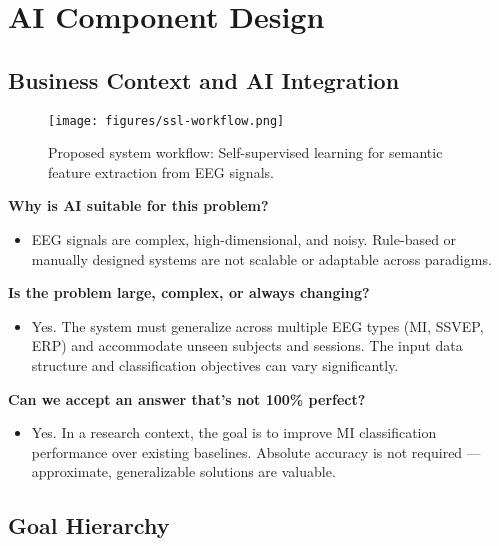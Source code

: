 \usepackage{enumitem}
\chapter{AI Component Design}
\label{ch:ai-component-design}

\section{Business Context and AI Integration}
\label{sec:business-context}

\begin{figure}[H]
    \centering
    \texttt{[image: figures/ssl-workflow.png]}
    \caption{Proposed system workflow: Self-supervised learning for semantic feature extraction from EEG signals.}
    \label{fig:ssl-workflow}
\end{figure}

\vspace{1em}
\noindent\textbf{Why is AI suitable for this problem?}
\begin{itemize}
    \item EEG signals are complex, high-dimensional, and noisy.
    Rule-based or manually designed systems are not scalable or adaptable across paradigms.
\end{itemize}

\vspace{0.5em}
\noindent\textbf{Is the problem large, complex, or always changing?}
\begin{itemize}
    \item Yes.
    The system must generalize across multiple EEG types (MI, SSVEP, ERP) and accommodate unseen subjects and sessions.
    The input data structure and classification objectives can vary significantly.
\end{itemize}

\vspace{0.5em}
\noindent\textbf{Can we accept an answer that’s not 100\% perfect?}
\begin{itemize}
    \item Yes.
    In a research context, the goal is to improve MI classification performance over existing baselines.
    Absolute accuracy is not required — approximate, generalizable solutions are valuable.
\end{itemize}

\section{Goal Hierarchy}
\label{sec:goal-hierarchy}

